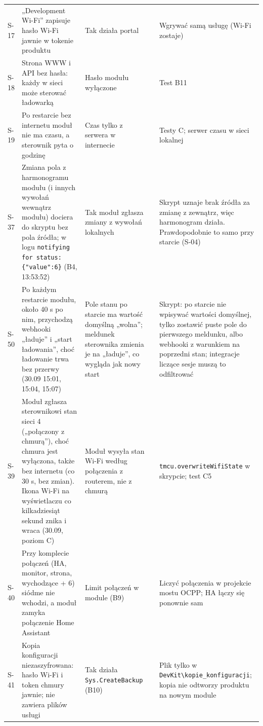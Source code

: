 \documentclass[11pt,a4paper]{article}
\begin{document}
\begin{longtable}{>{\raggedright\arraybackslash}p{3.00cm}>{\raggedright\arraybackslash}p{3.81cm}>{\raggedright\arraybackslash}p{2.97cm}>{\raggedright\arraybackslash}p{0.81cm}>{\raggedright\arraybackslash}p{3.81cm}}
S-17 & „Development Wi-Fi” zapisuje hasło Wi-Fi jawnie w tokenie produktu & Tak działa portal & \leavevmode{\symbolfont\color{apamber}\textbf{◐}} & Wgrywać samą usługę (Wi-Fi zostaje) \\
S-18 & Strona WWW i API bez hasła: każdy w sieci może sterować ładowarką & Hasło modułu wyłączone & \leavevmode{\symbolfont\color{apred}\textbf{✘}} & Test B11 \\
S-19 & Po restarcie bez internetu moduł nie ma czasu, a sterownik pyta o godzinę & Czas tylko z serwera w internecie & \leavevmode{\symbolfont\color{apred}\textbf{✘}} & Testy C; serwer czasu w sieci lokalnej \\
S-37 & Zmiana pola z harmonogramu modułu (i innych wywołań wewnątrz modułu) dociera do skryptu bez pola źródła; w logu \texttt{notifying for status:\allowbreak{} \{"value":\allowbreak{}6\}} (B4, 13:53:52) & Tak moduł zgłasza zmiany z wywołań lokalnych & \leavevmode{\symbolfont\color{apamber}\textbf{◐}} & Skrypt uznaje brak źródła za zmianę z zewnątrz, więc harmonogram działa. Prawdopodobnie to samo przy starcie (S-04) \\
S-50 & Po każdym restarcie modułu, około 40 s po nim, przychodzą webhooki „ładuje” i „start ładowania”, choć ładowanie trwa bez przerwy (30.09 15:01, 15:04, 15:07) & Pole stanu po starcie ma wartość domyślną „wolna”; meldunek sterownika zmienia je na „ładuje”, co wygląda jak nowy start & \leavevmode{\symbolfont\color{apred}\textbf{✘}} & Skrypt: po starcie nie wpisywać wartości domyślnej, tylko zostawić puste pole do pierwszego meldunku, albo webhooki z warunkiem na poprzedni stan; integracje liczące sesje muszą to odfiltrować \\
S-39 & Moduł zgłasza sterownikowi stan sieci 4 („połączony z chmurą”), choć chmura jest wyłączona, także bez internetu (co 30 s, bez zmian). Ikona Wi-Fi na wyświetlaczu co kilkadziesiąt sekund znika i wraca (30.09, poziom C) & Moduł wysyła stan Wi-Fi według połączenia z routerem, nie z chmurą & \leavevmode{\symbolfont\color{apred}\textbf{✘}} & \texttt{tmcu.\allowbreak{}overwriteWifiState} w skrypcie; test C5 \\
S-40 & Przy komplecie połączeń (HA, monitor, strona, wychodzące + 6) siódme nie wchodzi, a moduł zamyka połączenie Home Assistant & Limit połączeń w module (B9) & \leavevmode{\symbolfont\color{apred}\textbf{✘}} & Liczyć połączenia w projekcie mostu OCPP; HA łączy się ponownie sam \\
S-41 & Kopia konfiguracji niezaszyfrowana: hasło Wi-Fi i token chmury jawnie; nie zawiera plików usługi & Tak działa \texttt{Sys.\allowbreak{}CreateBackup} (B10) & \leavevmode{\symbolfont\color{apamber}\textbf{◐}} & Plik tylko w \texttt{DevKit\textbackslash{}kopie\_\allowbreak{}konfiguracji}; kopia nie odtworzy produktu na nowym module \\

\end{longtable}
\end{document}

